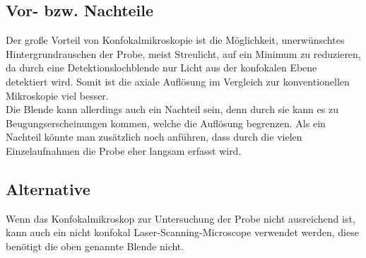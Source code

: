 \subsection{Vor- bzw. Nachteile}
Der große Vorteil von Konfokalmikroskopie ist die Möglichkeit, 
unerwünschtes Hintergrundrauschen der Probe, meist Streulicht,
auf ein Minimum zu reduzieren, da durch eine Detektionslochblende nur 
Licht aus der konfokalen Ebene detektiert wird. 
Somit ist die axiale Auflösung im Vergleich zur konventionellen 
Mikroskopie viel besser.\\
Die Blende kann allerdings auch ein Nachteil sein, denn durch sie kann
es zu Beugungserscheinungen kommen, welche die Auflösung begrenzen.  
Als ein Nachteil könnte man zusätzlich noch anführen, dass durch die 
vielen Einzelaufnahmen die Probe eher langsam erfasst wird. 
\subsection{Alternative}
Wenn das Konfokalmikroskop zur Untersuchung der Probe nicht ausreichend ist, kann  
auch ein nicht konfokal Laser-Scanning-Microscope verwendet werden, diese benötigt die oben
genannte Blende nicht.
